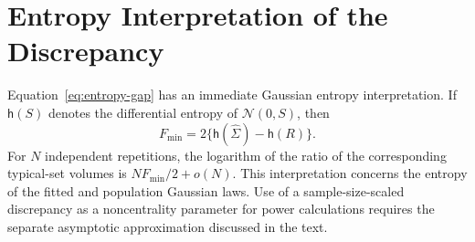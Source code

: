 \section{Entropy Interpretation of the Discrepancy}
\label{app:entropy}

Equation~\eqref{eq:entropy-gap} has an immediate Gaussian entropy interpretation. If $\mathsf h(S)$ denotes the differential entropy of $\mathcal N(0,S)$, then
\[
F_{\min}=2\{\mathsf h(\hat\Sigma)-\mathsf h(R)\}.
\]
For $N$ independent repetitions, the logarithm of the ratio of the corresponding typical-set volumes is $NF_{\min}/2+o(N)$. This interpretation concerns the entropy of the fitted and population Gaussian laws. Use of a sample-size-scaled discrepancy as a noncentrality parameter for power calculations requires the separate asymptotic approximation discussed in the text.
